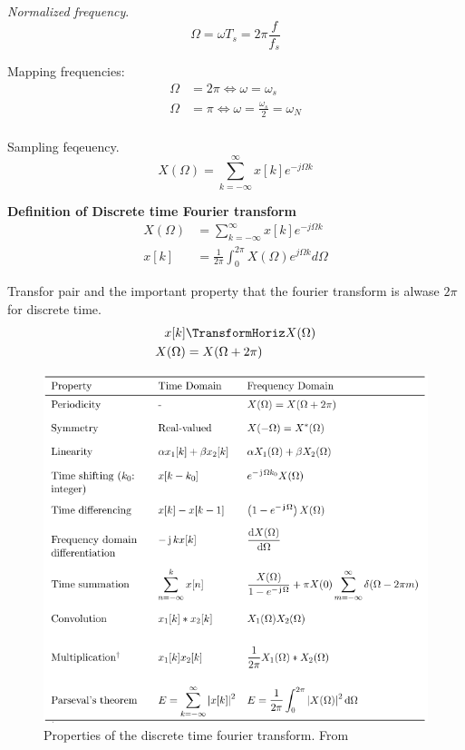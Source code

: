 \textit{Normalized frequency}.
\begin{equation*}
    \Omega = \omega T_s = 2\pi\frac{f}{f_s}
\end{equation*}

Mapping frequencies:
\begin{align*}
    \Omega &= 2\pi \Leftrightarrow \omega = \omega_s \\
    \Omega &= \pi \Leftrightarrow \omega = \frac{\omega_s}{2} = \omega_N \\
\end{align*}

Sampling feqeuency.
\begin{equation*}
    X(\Omega) = \sum_{k=-\infty}^{\infty} x[k]e^{-j\Omega k}
\end{equation*}

\newpage
\textbf{Definition of Discrete time Fourier transform}
\begin{align*}
    X(\Omega) &= \sum_{k=-\infty}^{\infty} x[k]e^{-j\Omega k} \\
    x[k] &= \frac{1}{2\pi}\int_0^{2\pi} X(\Omega)e^{j\Omega k} d\Omega
\end{align*}

Transfor pair and the important property that the fourier transform is alwase 
$2\pi$ for discrete time.
\begin{align*}
    x[k] &\TransformHoriz X(\Omega) \\
    X(\Omega) &= X(\Omega + 2\pi) \\
\end{align*}

\begin{figure}[!ht]
    \centering
    \includegraphics[width=12cm]{image/properties_discrete_time_fourier_transform.png}
    \caption{Properties of the discrete time fourier transform. From \cite{}}
    \label{fig:properties_of_the_discrete_time_fourier_transform}
\end{figure}

